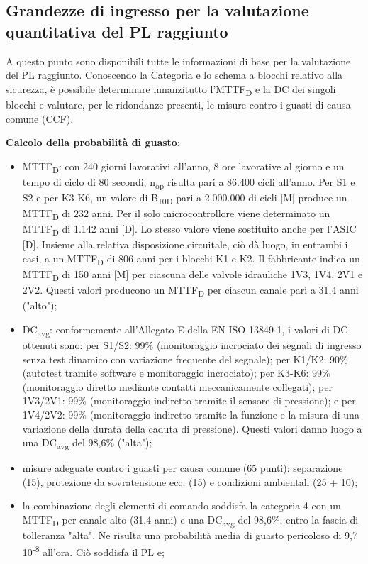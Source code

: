\subsection{Grandezze di ingresso per la valutazione quantitativa del PL raggiunto}
\label{subsec:06-5-5}
A questo punto sono disponibili tutte le informazioni di base per la valutazione del PL raggiunto. Conoscendo la Categoria e lo schema a blocchi relativo alla sicurezza, è possibile determinare innanzitutto l'MTTF\textsubscript{D} e la DC dei singoli blocchi e valutare, per le ridondanze presenti, le misure contro i guasti di causa comune (CCF).

\textbf{Calcolo della probabilità di guasto}:
\begin{itemize}
    \item MTTF\textsubscript{D}: con 240 giorni lavorativi all'anno, 8 ore lavorative al giorno e un tempo di ciclo di 80 secondi, n\textsubscript{op} risulta pari a 86.400 cicli all'anno. Per S1 e S2 e per K3-K6, un valore di B\textsubscript{10D} pari a 2.000.000 di cicli [M] produce un MTTF\textsubscript{D} di 232 anni. Per il solo microcontrollore viene determinato un MTTF\textsubscript{D} di 1.142 anni [D]. Lo stesso valore viene sostituito anche per l'ASIC [D]. Insieme alla relativa disposizione circuitale, ciò dà luogo, in entrambi i casi, a un MTTF\textsubscript{D} di 806 anni per i blocchi K1 e K2. Il fabbricante indica un MTTF\textsubscript{D} di 150 anni [M] per ciascuna delle valvole idrauliche 1V3, 1V4, 2V1 e 2V2. Questi valori producono un MTTF\textsubscript{D} per ciascun canale pari a 31,4 anni ("alto");
    \item DC\textsubscript{avg}: conformemente all'Allegato E della EN ISO 13849-1, i valori di DC ottenuti sono: per S1/S2: 99\% (monitoraggio incrociato dei segnali di ingresso senza test dinamico con variazione frequente del segnale); per K1/K2: 90\% (autotest tramite software e monitoraggio incrociato); per K3-K6: 99\% (monitoraggio diretto mediante contatti meccanicamente collegati); per 1V3/2V1: 99\% (monitoraggio indiretto tramite il sensore di pressione); e per 1V4/2V2: 99\% (monitoraggio indiretto tramite la funzione e la misura di una variazione della durata della caduta di pressione). Questi valori danno luogo a una DC\textsubscript{avg} del 98,6\% ("alta");
    \item misure adeguate contro i guasti per causa comune (65 punti): separazione (15), protezione da sovratensione ecc. (15) e condizioni ambientali (25 + 10);
    \item la combinazione degli elementi di comando soddisfa la categoria 4 con un MTTF\textsubscript{D} per canale alto (31,4 anni) e una DC\textsubscript{avg} del 98,6\%, entro la fascia di tolleranza "alta". Ne risulta una probabilità media di guasto pericoloso di 9,7 10\textsuperscript{-8} all'ora. Ciò soddisfa il PL e;
\end{itemize}

